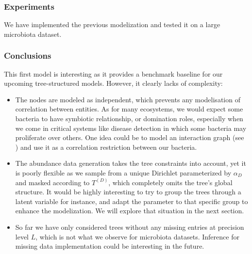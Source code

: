 
\subsubsection{Experiments}

We have implemented the previous modelization and tested it on a large microbiota dataset.

\subsubsection{Conclusions}

This first model is interesting as it provides a benchmark baseline for our upcoming tree-structured models.
However, it clearly lacks of complexity:
\begin{itemize}
    \item The nodes are modeled as independent, which prevents any modelisation of correlation between entities.
          As for many ecosystems, we would expect some bacteria to have symbiotic relationship, or domination roles,
          especially when we come in critical systems like disease detection in which some bacteria may proliferate over others.
          One idea could be to model an interaction graph (see \cite{momal_tree}) and use it as a correlation restriction between our bacteria.
    \item The abundance data generation takes the tree constraints into account, yet it is poorly flexible as we sample from a unique Dirichlet
          parameterized by $\alpha_D$ and masked according to $T^{(D)}$, which completely omits the tree's global structure.
          It would be highly interesting to try to group the trees through a latent variable for instance, and adapt the parameter
          to that specific group to enhance the modelization.
          We will explore that situation in the next section.
    \item So far we have only considered trees without any missing entries at precision level $L$, which is not what we observe for microbiota datasets.
          Inference for missing data implementation could be interesting in the future.
\end{itemize}